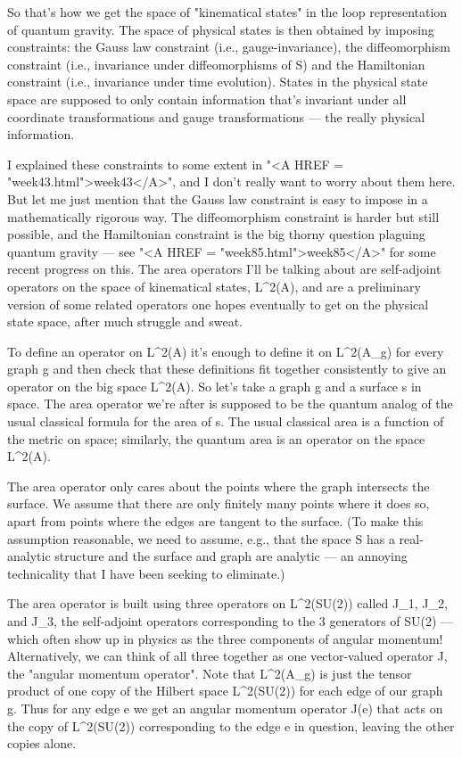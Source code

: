 So that's how we get the space of "kinematical states" in the loop
representation of quantum gravity.  The space of physical states is
then obtained by imposing constraints: the Gauss law constraint (i.e.,
gauge-invariance), the diffeomorphism constraint (i.e., invariance
under diffeomorphisms of S) and the Hamiltonian constraint (i.e.,
invariance under time evolution).  States in the physical state space
are supposed to only contain information that's invariant under all
coordinate transformations and gauge transformations --- the really
physical information.

I explained these constraints to some extent in "<A HREF = "week43.html">week43</A>", and I don't
really want to worry about them here.  But let me just mention that
the Gauss law constraint is easy to impose in a mathematically
rigorous way.  The diffeomorphism constraint is harder but still
possible, and the Hamiltonian constraint is the big thorny question
plaguing quantum gravity --- see "<A HREF = "week85.html">week85</A>" for some recent progress on
this.  The area operators I'll be talking about are self-adjoint
operators on the space of kinematical states, L^2(A), and are
a preliminary version of some related operators one hopes eventually
to get on the physical state space, after much struggle and sweat.

To define an operator on L^2(A) it's enough to define it on L^2(A_g)
for every graph g and then check that these definitions fit together
consistently to give an operator on the big space L^2(A).  So let's
take a graph g and a surface s in space.  The area operator we're
after is supposed to be the quantum analog of the usual classical
formula for the area of s.  The usual classical area is a function of
the metric on space; similarly, the quantum area is an operator on the
space L^2(A).  

The area operator only cares about the points where the graph
intersects the surface.  We assume that there are only finitely many
points where it does so, apart from points where the edges are tangent
to the surface.  (To make this assumption reasonable, we need to
assume, e.g., that the space S has a real-analytic structure and the
surface and graph are analytic --- an annoying technicality that I
have been seeking to eliminate.)
 
The area operator is built using three operators on L^2(SU(2)) called
J_1, J_2, and J_3, the self-adjoint operators corresponding to the 3
generators of SU(2) --- which often show up in physics as the three
components of angular momentum!  Alternatively, we can think of all
three together as one vector-valued operator J, the "angular momentum
operator".  Note that L^2(A_g) is just the tensor product of one copy
of the Hilbert space L^2(SU(2)) for each edge of our graph g.  Thus
for any edge e we get an angular momentum operator J(e) that acts on
the copy of L^2(SU(2)) corresponding to the edge e in question,
leaving the other copies alone.

